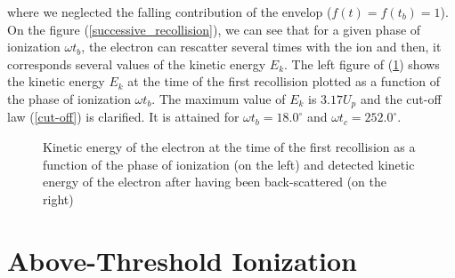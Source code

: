 \documentclass[a4paper]{article}
\begin{document}
where we neglected the falling contribution of the envelop ($f(t)=f(t_{b})=1$). \\
On the figure (\ref{successive_recollision}), we can see that for a given phase of ionization $\omega t_{b}$, the electron can rescatter several times with the ion and then, it corresponds several values of the kinetic energy $E_{k}$. 
The left figure of (\ref{kinetic_energy}) shows the kinetic energy $E_{k}$ at the time of the first recollision plotted as a function of the phase of ionization $\omega t_{b}$. The maximum value of $E_{k}$ is $3.17U_{p}$ and the cut-off law (\ref{cut-off}) is clarified. It is attained for $\omega t_{b}=18.0^{\circ}$ and $\omega t_{c}=252.0^{\circ}$. \\
\begin{figure}
\centering
 
 \caption{Kinetic energy of the electron at the time of the first recollision as a function of the phase of ionization (on the left) and detected kinetic energy of the electron after having been back-scattered (on the right)}
 \label{kinetic_energy} 
\end{figure}


\section{Above-Threshold Ionization}
\end{document}
